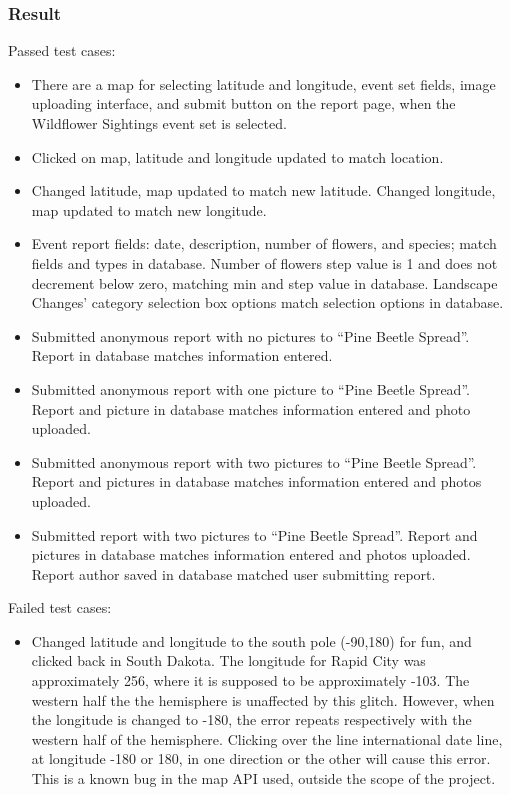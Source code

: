 \subsubsection{Result}
Passed test cases:
\begin{itemize}
\item There are a map for selecting latitude and longitude, event set fields, image uploading interface, and submit button on the report page, when the Wildflower Sightings event set is selected.
\item Clicked on map, latitude and longitude updated to match location.
\item Changed latitude, map updated to match new latitude. Changed longitude, map updated to match new longitude.
\item Event report fields: date, description, number of flowers, and species; match fields and types in database. Number of flowers step value is 1 and does not decrement below zero, matching min and step value in database. Landscape Changes' category selection box options match selection options in database. 
\item Submitted anonymous report with no pictures to ``Pine Beetle Spread''. Report in database matches information entered.
\item Submitted anonymous report with one picture to ``Pine Beetle Spread''. Report and picture in database matches information entered and photo uploaded.
\item Submitted anonymous report with two pictures to ``Pine Beetle Spread''. Report and pictures in database matches information entered and photos uploaded.
\item Submitted report with two pictures to ``Pine Beetle Spread''. Report and pictures in database matches information entered and photos uploaded. Report author saved in database matched user submitting report.
\end{itemize}
Failed test cases:
\begin{itemize}
\item Changed latitude and longitude to the south pole (-90,180) for fun, and clicked back in South Dakota. The longitude for Rapid City was approximately 256, where it is supposed to be approximately -103. The western half the the hemisphere is unaffected by this glitch. However, when the longitude is changed to -180, the error repeats respectively with the western half of the hemisphere. Clicking over the line international date line, at longitude -180 or 180, in one direction or the other will cause this error. This is a known bug in the map API used, outside the scope of the project. 
\end{itemize}
